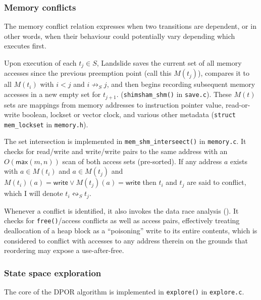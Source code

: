 \subsubsection{Memory conflicts}

The memory conflict relation expresses when two transitions are dependent,
or in other words, when their behaviour could potentially vary depending which executes first.

Upon execution of each $t_j \in S$,
Landslide saves the current set of all memory accesses since the previous preemption point (call this $M(t_j)$),
compares it to all $M(t_i)$ with $i < j$ and $i \not\rightarrow_S j$,
and then begins recording subsequent memory accesses in a new empty set for $t_{j+1}$.
({\tt shimsham\_shm()} in {\tt save.c}).
These $M(t)$ sets are mappings from memory addresses to
instruction pointer value, read-or-write boolean, lockset or vector clock, and various other metadata
({\tt struct mem\_lockset} in {\tt memory.h}).

The set intersection is implemented in {\tt mem\_shm\_interseect()} in {\tt memory.c}.
It checks for read/write and write/write pairs to the same address with an $O(\mathsf{max}(m,n))$ scan of both access sets (pre-sorted).
If any address $a$ exists with $a \in M(t_i)$ and $a \in M(t_j)$ and $M(t_i)(a) = \mathsf{write} \vee M(t_j)(a) = \mathsf{write}$
then $t_i$ and $t_j$ are said to conflict,
which I will denote $t_i \leftrightsquigarrow_S t_j$.

Whenever a conflict is identified, it also invokes the data race analysis (\sect{\ref{sec:landslide-datarace}}).
It checks for {\tt free()}/access conflicts as well as access pairs,
effectively treating deallocation of a heap block as a ``poisoning'' write to its entire contents,
which is considered to conflict with accesses to any address therein
on the grounds that reordering may expose a use-after-free.

\subsubsection{State space exploration}
\label{sec:landslide-explore}

The core of the DPOR algorithm is implemented in {\tt explore()} in {\tt explore.c}.

